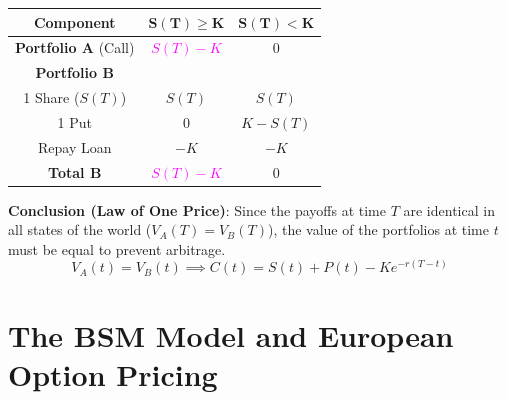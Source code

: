 \begin{center}
\renewcommand{\arraystretch}{1.5}
\begin{tabular}{c|c|c}
    \toprule
    \textbf{Component} & $\boldsymbol{S(T) \ge K}$ & $\boldsymbol{S(T) < K}$ \\
    \hline
    \textbf{Portfolio A} (Call) & \textcolor{magenta}{$S(T) - K$} & \textcolor{green!60!black}{$0$} \\
    \hline
    \textbf{Portfolio B} & & \\
    1 Share ($S(T)$) & $S(T)$ & $S(T)$ \\
    1 Put & $0$ & $K - S(T)$ \\
    Repay Loan & $-K$ & $-K$ \\
    \hline
    \textbf{Total B} & \textcolor{magenta}{$S(T) - K$} & \textcolor{green!60!black}{$0$} \\
    \bottomrule
\end{tabular}
\end{center}

\textbf{Conclusion (Law of One Price)}: Since the payoffs at time $T$ are identical in all states of the world ($V_A(T) = V_B(T)$), the value of the portfolios at time $t$ must be equal to prevent arbitrage.
\[
V_A(t) = V_B(t) \implies C(t) = S(t) + P(t) - Ke^{-r(T-t)}
\]

\section{The BSM Model and European Option Pricing}

